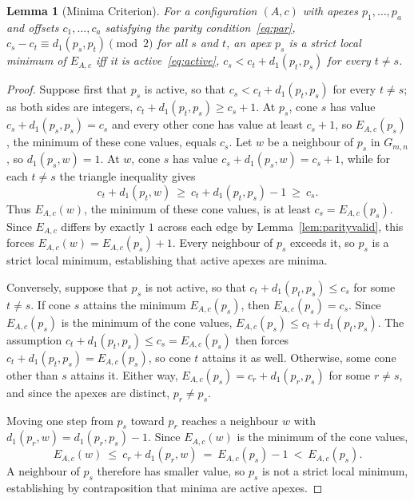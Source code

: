 \documentclass[11pt]{article}
\newtheorem{lemma}[theorem]{Lemma}
\theoremstyle{definition}
\theoremstyle{remark}
\newcommand{\dgrid}{d_1}
\newcommand{\Gmn}{G_{m,n}}
\begin{document}
\begin{lemma}[Minima Criterion]\label{lem:activemin}
For a configuration $(A,c)$ with apexes $p_1,\dots,p_a$ and offsets
$c_1,\dots,c_a$ satisfying the parity condition~\eqref{eq:par},
$c_s-c_t\equiv\dgrid(p_s,p_t)\pmod 2$ for all $s$ and $t$, an apex $p_s$
is a strict local minimum of $E_{A,c}$ iff it is
active~\eqref{eq:active}, $c_s<c_t+\dgrid(p_t,p_s)$ for every $t\ne s$.
\end{lemma}

\begin{proof}
Suppose first that $p_s$ is active, so that
$c_s < c_t + \dgrid(p_t,p_s)$ for every $t \ne s$; as both sides are
integers, $c_t + \dgrid(p_t,p_s) \ge
c_s + 1$. At $p_s$, cone $s$ has value $c_s + \dgrid(p_s,p_s) = c_s$ and
every other cone has value at least $c_s + 1$, so $E_{A,c}(p_s)$, the
minimum of these cone values, equals $c_s$.
Let $w$ be a neighbour of $p_s$ in $\Gmn$, so $\dgrid(p_s,w) = 1$. At
$w$, cone $s$ has value $c_s + \dgrid(p_s,w) = c_s + 1$, while for each
$t \ne s$ the triangle inequality gives
\[
  c_t + \dgrid(p_t,w) \ \ge\ c_t + \dgrid(p_t,p_s) - 1 \ \ge\ c_s .
\]
Thus $E_{A,c}(w)$, the minimum of these cone values, is at least
$c_s = E_{A,c}(p_s)$. Since $E_{A,c}$ differs by exactly $1$ across each
edge by Lemma~\ref{lem:parityvalid}, this forces
$E_{A,c}(w) = E_{A,c}(p_s) + 1$. Every neighbour of $p_s$ exceeds it, so
$p_s$ is a strict local minimum, establishing that active apexes are
minima.

\medskip\noindent
Conversely, suppose that $p_s$ is not active, so that
$c_t + \dgrid(p_t,p_s) \le c_s$ for some $t \ne s$. If cone $s$ attains
the minimum $E_{A,c}(p_s)$, then $E_{A,c}(p_s) = c_s$. Since
$E_{A,c}(p_s)$ is the minimum of the cone values,
$E_{A,c}(p_s) \le c_t + \dgrid(p_t,p_s)$. The assumption
$c_t + \dgrid(p_t,p_s) \le c_s = E_{A,c}(p_s)$ then forces
$c_t + \dgrid(p_t,p_s) = E_{A,c}(p_s)$, so cone $t$ attains it as well.
Otherwise, some cone other than $s$ attains it. Either way,
$E_{A,c}(p_s) = c_r + \dgrid(p_r,p_s)$ for some $r \ne s$, and since the
apexes are distinct, $p_r \ne p_s$.

\medskip\noindent
Moving one step from $p_s$ toward $p_r$ reaches a neighbour $w$ with
$\dgrid(p_r,w) = \dgrid(p_r,p_s) - 1$. Since $E_{A,c}(w)$ is the minimum
of the cone values,
\[
  E_{A,c}(w) \ \le\ c_r + \dgrid(p_r,w) \ =\ E_{A,c}(p_s) - 1 \ <\ E_{A,c}(p_s) .
\]
A neighbour of $p_s$ therefore has smaller value, so $p_s$ is not a strict
local minimum, establishing by contraposition that minima are active apexes.
\end{proof}
\end{document}
